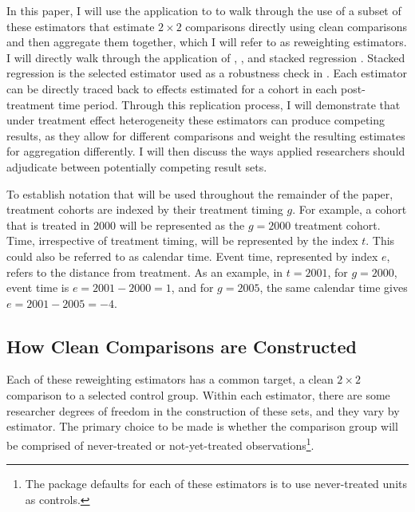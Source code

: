 \documentclass[12pt]{article}
\begin{document}
In this paper, I will use the application to \cite{payson2025residency} to walk through the use of a subset of these estimators that estimate $2 \times 2$ comparisons directly using clean comparisons and then aggregate them together, which I will refer to as reweighting estimators. I will directly walk through the application of \textcite{sun2021estimating}, \textcite{callaway2021difference}, and stacked regression \parencite{baker2022much, cengiz2019effect, wing2024stacked}. Stacked regression is the selected estimator used as a robustness check in \textcite{payson2025residency}. Each estimator can be directly traced back to effects estimated for a cohort in each post-treatment time period. Through this replication process, I will demonstrate that under treatment effect heterogeneity these estimators can produce competing results, as they allow for different comparisons and weight the resulting estimates for aggregation differently. I will then discuss the ways applied researchers should adjudicate between potentially competing result sets.

To establish notation that will be used throughout the remainder of the paper, treatment cohorts are indexed by their treatment timing $g$. For example, a cohort that is treated in $2000$ will be represented as the $g = 2000$ treatment cohort. Time, irrespective of treatment timing, will be represented by the index $t$. This could also be referred to as calendar time. Event time, represented by index $e$, refers to the distance from treatment. As an example, in $t = 2001$, for $g = 2000$, event time is $e = 2001 - 2000 = 1$, and for $g = 2005$, the same calendar time gives $e = 2001 - 2005 = -4$. 

\subsection{How Clean Comparisons are Constructed}\label{sec:cc_const}

Each of these reweighting estimators has a common target, a clean $2 \times 2$ comparison to a selected control group. Within each estimator, there are some researcher degrees of freedom in the construction of these sets, and they vary by estimator. The primary choice to be made is whether the comparison group will be comprised of never-treated or not-yet-treated observations\footnote{The package defaults for each of these estimators is to use never-treated units as controls.}.
\end{document}
